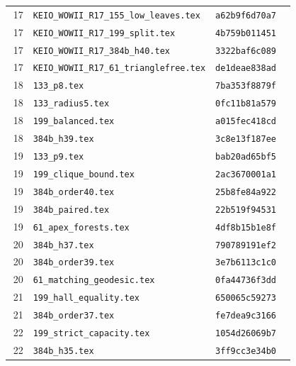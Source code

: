 \documentclass[11pt,a4paper]{article}
\theoremstyle{definition}\newtheorem{definition}[theorem]{Definition}
\theoremstyle{remark}\newtheorem{remark}[theorem]{Remark}
\begin{document}
\begin{longtable}{rp{0.64\linewidth}l}
17&\nolinkurl{KEIO_WOWII_R17_155_low_leaves.tex}&\texttt{a62b9f6d70a7}\\

17&\nolinkurl{KEIO_WOWII_R17_199_split.tex}&\texttt{4b759b011451}\\

17&\nolinkurl{KEIO_WOWII_R17_384b_h40.tex}&\texttt{3322baf6c089}\\

17&\nolinkurl{KEIO_WOWII_R17_61_trianglefree.tex}&\texttt{de1deae838ad}\\

18&\nolinkurl{133_p8.tex}&\texttt{7ba353f8879f}\\

18&\nolinkurl{133_radius5.tex}&\texttt{0fc11b81a579}\\

18&\nolinkurl{199_balanced.tex}&\texttt{a015fec418cd}\\

18&\nolinkurl{384b_h39.tex}&\texttt{3c8e13f187ee}\\

19&\nolinkurl{133_p9.tex}&\texttt{bab20ad65bf5}\\

19&\nolinkurl{199_clique_bound.tex}&\texttt{2ac3670001a1}\\

19&\nolinkurl{384b_order40.tex}&\texttt{25b8fe84a922}\\

19&\nolinkurl{384b_paired.tex}&\texttt{22b519f94531}\\

19&\nolinkurl{61_apex_forests.tex}&\texttt{4df8b15b1e8f}\\

20&\nolinkurl{384b_h37.tex}&\texttt{790789191ef2}\\

20&\nolinkurl{384b_order39.tex}&\texttt{3e7b6113c1c0}\\

20&\nolinkurl{61_matching_geodesic.tex}&\texttt{0fa44736f3dd}\\

21&\nolinkurl{199_hall_equality.tex}&\texttt{650065c59273}\\

21&\nolinkurl{384b_order37.tex}&\texttt{fe7dea9c3166}\\

22&\nolinkurl{199_strict_capacity.tex}&\texttt{1054d26069b7}\\

22&\nolinkurl{384b_h35.tex}&\texttt{3ff9cc3e34b0}\\

\bottomrule
\end{longtable}
\end{document}
